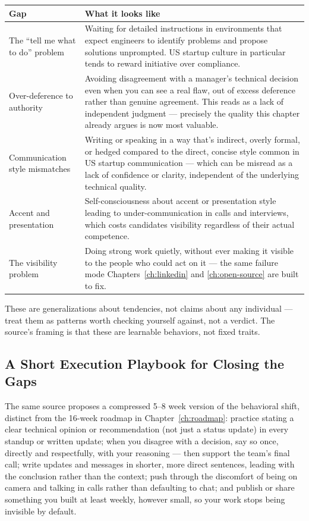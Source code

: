 \begin{longtable}{p{} p{}}
\toprule
\textbf{Gap} & \textbf{What it looks like} \\
\midrule
\endhead
The ``tell me what to do'' problem & Waiting for detailed instructions in environments that expect engineers to
identify problems and propose solutions unprompted. US startup culture in particular tends to reward initiative
over compliance. \\
Over-deference to authority & Avoiding disagreement with a manager's technical decision even when you can see a
real flaw, out of excess deference rather than genuine agreement. This reads as a lack of independent judgment —
precisely the quality this chapter already argues is now most valuable. \\
Communication style mismatches & Writing or speaking in a way that's indirect, overly formal, or hedged compared
to the direct, concise style common in US startup communication — which can be misread as a lack of confidence
or clarity, independent of the underlying technical quality. \\
Accent and presentation & Self-consciousness about accent or presentation style leading to under-communication
in calls and interviews, which costs candidates visibility regardless of their actual competence. \\
The visibility problem & Doing strong work quietly, without ever making it visible to the people who could act
on it — the same failure mode Chapters~\ref{ch:linkedin} and \ref{ch:open-source} are built to fix. \\
\bottomrule
\end{longtable}

\begin{caution}
These are generalizations about tendencies, not claims about any individual — treat them as patterns worth
checking yourself against, not a verdict. The source's framing is that these are learnable behaviors, not fixed
traits.
\end{caution}

\subsection{A Short Execution Playbook for Closing the Gaps}

The same source proposes a compressed 5--8 week version of the behavioral shift, distinct from the 16-week
roadmap in Chapter~\ref{ch:roadmap}: practice stating a clear technical opinion or recommendation (not just a
status update) in every standup or written update; when you disagree with a decision, say so once, directly and
respectfully, with your reasoning — then support the team's final call; write updates and messages in shorter,
more direct sentences, leading with the conclusion rather than the context; push through the discomfort of
being on camera and talking in calls rather than defaulting to chat; and publish or share something you built at
least weekly, however small, so your work stops being invisible by default.


